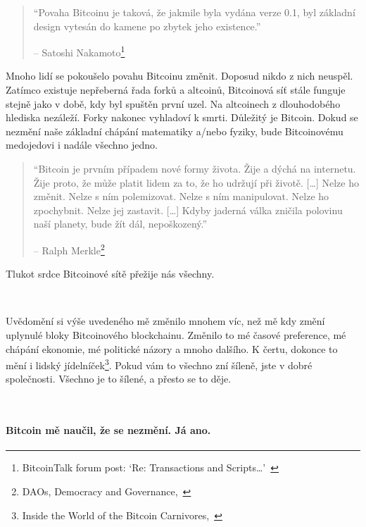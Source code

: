 \begin{quotation}\begin{samepage}
\enquote{Povaha Bitcoinu je taková, že jakmile byla vydána verze 0.1, byl základní 
design vytesán do kamene po zbytek jeho existence.}
\begin{flushright} -- Satoshi Nakamoto\footnote{BitcoinTalk forum post: `Re:
Transactions and Scripts\ldots'~\cite{satoshi-set-in-stone}}
\end{flushright}\end{samepage}\end{quotation}

Mnoho lidí se pokoušelo povahu Bitcoinu změnit. Doposud nikdo z nich neuspěl. 
Zatímco existuje nepřeberná řada forků a altcoinů, Bitcoinová síť stále funguje 
stejně jako v době, kdy byl spuštěn první uzel. Na altcoinech z dlouhodobého 
hlediska nezáleží. Forky nakonec vyhladoví k smrti. Důležitý je Bitcoin. Dokud 
se nezmění naše základní chápání matematiky a/nebo fyziky, bude Bitcoinovému 
medojedovi i nadále všechno jedno.

\begin{quotation}\begin{samepage}
\enquote{Bitcoin je prvním případem nové formy života. Žije a dýchá na internetu. 
Žije proto, že může platit lidem za to, že ho udržují při životě. [\ldots] Nelze 
ho změnit. Nelze s ním polemizovat. Nelze s ním manipulovat. Nelze ho zpochybnit. 
Nelze jej zastavit. [\ldots] Kdyby jaderná válka zničila polovinu naší planety, 
bude žít dál, nepoškozený.}
\begin{flushright} -- Ralph Merkle\footnote{DAOs, Democracy and
Governance,~\cite{merkle-dao}}
\end{flushright}\end{samepage}\end{quotation}

Tlukot srdce Bitcoinové sítě přežije nás všechny.

~

Uvědomění si výše uvedeného mě změnilo mnohem víc, než mě kdy změní uplynulé bloky 
Bitcoinového blockchainu. Změnilo to mé časové preference, mé chápání ekonomie, 
mé politické názory a mnoho dalšího. K čertu, dokonce to mění i lidský 
jídelníček\footnote{Inside the World of the Bitcoin Carnivores,~\cite{carnivores}}. 
Pokud vám to všechno zní šíleně, jste v dobré společnosti. 
Všechno je to šílené, a přesto se to děje.

~

\paragraph{Bitcoin mě naučil, že se nezmění. Já ano.}


